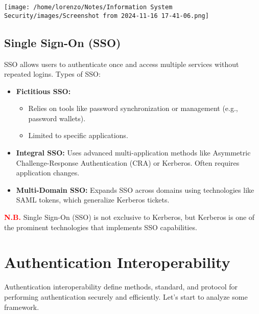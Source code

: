 \begin{enumerate}
\begin{minipage}{0.5\textwidth}
\begin{customquote}
        \end{customquote}
    \end{minipage} 
    \hspace{1cm}
    \begin{minipage}{0.3\textwidth}
        \centering
        \texttt{[image: /home/lorenzo/Notes/Information System Security/images/Screenshot from 2024-11-16 17-41-06.png]}
    \end{minipage}
\end{enumerate}

\subsection{Single Sign-On (SSO)}
SSO allows users to authenticate once and access multiple services without repeated logins.
Types of SSO:
\begin{itemize}
    \item \textbf{Fictitious SSO:}
    \begin{itemize}
        \item Relies on tools like password synchronization or management (e.g., password wallets).
        \item Limited to specific applications.
    \end{itemize}
    \item \textbf{Integral SSO:} Uses advanced multi-application methods like Asymmetric Challenge-Response Authentication (CRA) or Kerberos.
    Often requires application changes.
    \item \textbf{Multi-Domain SSO:} Expands SSO across domains using technologies like SAML tokens, which generalize Kerberos tickets.
\end{itemize}
\textcolor{red}{\textbf{N.B.}} Single Sign-On (SSO) is not exclusive to Kerberos, but Kerberos is one of the prominent technologies that implements SSO capabilities.

\section{Authentication Interoperability}
Authentication interoperability define methods, standard, and protocol for performing authentication securely and efficiently. Let's start to analyze some framework.

